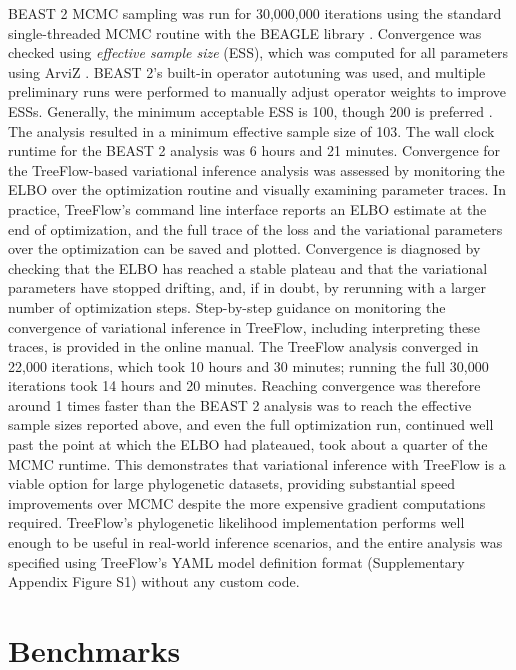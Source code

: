 \documentclass{article}
\begin{document}
BEAST 2 MCMC sampling was run for 30,000,000 iterations using the standard single-threaded MCMC routine with the BEAGLE library \cite{ayres2019beagle}. Convergence was checked using \textit{effective sample size} (ESS), which was computed for all parameters using ArviZ \cite{kumar2019arviz}. BEAST 2's built-in operator autotuning was used, and multiple preliminary runs were performed to manually adjust operator weights to improve ESSs. Generally, the minimum acceptable ESS is 100, though 200 is preferred \cite{drummond2015bayesian}. The analysis resulted in a minimum effective sample size of 103. The wall clock runtime for the BEAST 2 analysis was 6 hours and 21 minutes. Convergence for the TreeFlow-based variational inference analysis was assessed by monitoring the ELBO over the optimization routine and visually examining parameter traces. In practice, TreeFlow's command line interface reports an ELBO estimate at the end of optimization, and the full trace of the loss and the variational parameters over the optimization can be saved and plotted. Convergence is diagnosed by checking that the ELBO has reached a stable plateau and that the variational parameters have stopped drifting, and, if in doubt, by rerunning with a larger number of optimization steps. Step-by-step guidance on monitoring the convergence of variational inference in TreeFlow, including interpreting these traces, is provided in the online manual. The TreeFlow analysis converged in 22,000 iterations, which took 10 hours and 30 minutes; running the full 30,000 iterations took 14 hours and 20 minutes. Reaching convergence was therefore around 1 times faster than the BEAST 2 analysis was to reach the effective sample sizes reported above, and even the full optimization run, continued well past the point at which the ELBO had plateaued, took about a quarter of the MCMC runtime. This demonstrates that variational inference with TreeFlow is a viable option for large phylogenetic datasets, providing substantial speed improvements over MCMC despite the more expensive gradient computations required. TreeFlow's phylogenetic likelihood implementation performs well enough to be useful in real-world inference scenarios, and the entire analysis was specified using TreeFlow's YAML model definition format (Supplementary Appendix Figure S1) without any custom code.

\section{Benchmarks}
\label{benchmarks}
\end{document}

